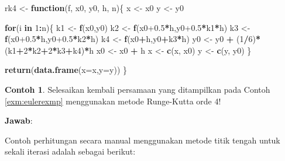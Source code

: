 \documentclass[
]{book}
\newenvironment{Shaded}{\begin{snugshade}}{\end{snugshade}}
\newcommand{\AttributeTok}[1]{\textcolor[rgb]{0.13,0.29,0.53}{#1}}
\newcommand{\ControlFlowTok}[1]{\textcolor[rgb]{0.13,0.29,0.53}{\textbf{#1}}}
\newcommand{\DecValTok}[1]{\textcolor[rgb]{0.00,0.00,0.81}{#1}}
\newcommand{\FloatTok}[1]{\textcolor[rgb]{0.00,0.00,0.81}{#1}}
\newcommand{\FunctionTok}[1]{\textcolor[rgb]{0.13,0.29,0.53}{\textbf{#1}}}
\newcommand{\NormalTok}[1]{#1}
\newcommand{\OtherTok}[1]{\textcolor[rgb]{0.56,0.35,0.01}{#1}}
\newcommand{\SpecialCharTok}[1]{\textcolor[rgb]{0.81,0.36,0.00}{\textbf{#1}}}
\theoremstyle{definition}
\theoremstyle{definition}
\newtheorem{example}{Contoh}[chapter]
\theoremstyle{definition}
\theoremstyle{definition}
\theoremstyle{remark}
\begin{document}
\begin{Shaded}
\begin{Highlighting}[]
\NormalTok{rk4 }\OtherTok{\textless{}{-}} \ControlFlowTok{function}\NormalTok{(f, x0, y0, h, n)\{}
\NormalTok{  x }\OtherTok{\textless{}{-}}\NormalTok{ x0}
\NormalTok{  y }\OtherTok{\textless{}{-}}\NormalTok{ y0}
  
  \ControlFlowTok{for}\NormalTok{(i }\ControlFlowTok{in} \DecValTok{1}\SpecialCharTok{:}\NormalTok{n)\{}
\NormalTok{    k1 }\OtherTok{\textless{}{-}} \FunctionTok{f}\NormalTok{(x0,y0)}
\NormalTok{    k2 }\OtherTok{\textless{}{-}} \FunctionTok{f}\NormalTok{(x0}\FloatTok{+0.5}\SpecialCharTok{*}\NormalTok{h,y0}\FloatTok{+0.5}\SpecialCharTok{*}\NormalTok{k1}\SpecialCharTok{*}\NormalTok{h)}
\NormalTok{    k3 }\OtherTok{\textless{}{-}} \FunctionTok{f}\NormalTok{(x0}\FloatTok{+0.5}\SpecialCharTok{*}\NormalTok{h,y0}\FloatTok{+0.5}\SpecialCharTok{*}\NormalTok{k2}\SpecialCharTok{*}\NormalTok{h)}
\NormalTok{    k4 }\OtherTok{\textless{}{-}} \FunctionTok{f}\NormalTok{(x0}\SpecialCharTok{+}\NormalTok{h,y0}\SpecialCharTok{+}\NormalTok{k3}\SpecialCharTok{*}\NormalTok{h)}
\NormalTok{    y0 }\OtherTok{\textless{}{-}}\NormalTok{ y0 }\SpecialCharTok{+}\NormalTok{ (}\DecValTok{1}\SpecialCharTok{/}\DecValTok{6}\NormalTok{)}\SpecialCharTok{*}\NormalTok{(k1}\SpecialCharTok{+}\DecValTok{2}\SpecialCharTok{*}\NormalTok{k2}\SpecialCharTok{+}\DecValTok{2}\SpecialCharTok{*}\NormalTok{k3}\SpecialCharTok{+}\NormalTok{k4)}\SpecialCharTok{*}\NormalTok{h}
\NormalTok{    x0 }\OtherTok{\textless{}{-}}\NormalTok{ x0 }\SpecialCharTok{+}\NormalTok{ h}
\NormalTok{    x }\OtherTok{\textless{}{-}} \FunctionTok{c}\NormalTok{(x, x0)}
\NormalTok{    y }\OtherTok{\textless{}{-}} \FunctionTok{c}\NormalTok{(y, y0)}
\NormalTok{  \}}
  
  \FunctionTok{return}\NormalTok{(}\FunctionTok{data.frame}\NormalTok{(}\AttributeTok{x=}\NormalTok{x,}\AttributeTok{y=}\NormalTok{y))}
\NormalTok{\}}
\end{Highlighting}
\end{Shaded}

\begin{example}
\protect\hypertarget{exm:rkexmp}{}\label{exm:rkexmp}Selesaikan kembali persamaan yang ditampilkan pada Contoh \ref{exm:eulerexmp} menggunakan metode Runge-Kutta orde 4!
\end{example}

\textbf{Jawab}:

Contoh perhitungan secara manual menggunakan metode titik tengah untuk sekali iterasi adalah sebagai berikut:
\end{document}
